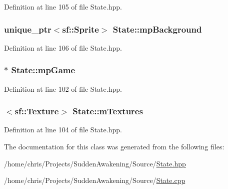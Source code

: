 Definition at line 105 of file State.\-hpp.

\hypertarget{class_state_ad77d6e8727cab4ac8ac5d44eacb41eba}{
\subsubsection[{mp\-Background}]{\setlength{\rightskip}{0pt plus 5cm}unique\-\_\-ptr$<$sf\-::\-Sprite$>$ State\-::mp\-Background\hspace{0.3cm}{\ttfamily [protected]}}}\label{class_state_ad77d6e8727cab4ac8ac5d44eacb41eba}


Definition at line 106 of file State.\-hpp.

\hypertarget{class_state_a418f507cf3deef8f3653b8209a9f7b85}{
\subsubsection[{mp\-Game}]{$\ast$ State\-::mp\-Game\hspace{0.3cm}{\ttfamily [protected]}}}\label{class_state_a418f507cf3deef8f3653b8209a9f7b85}


Definition at line 102 of file State.\-hpp.

\hypertarget{class_state_a4eb530bbd8c56bb10ab4e36adeb097d9}{
\subsubsection[{m\-Textures}]{$<$sf\-::\-Texture$>$ State\-::m\-Textures\hspace{0.3cm}{\ttfamily [protected]}}}\label{class_state_a4eb530bbd8c56bb10ab4e36adeb097d9}


Definition at line 104 of file State.\-hpp.



The documentation for this class was generated from the following files\-:\begin{DoxyCompactItemize}
\item 
/home/chris/\-Projects/\-Sudden\-Awakening/\-Source/\hyperlink{_state_8hpp}{State.\-hpp}\item 
/home/chris/\-Projects/\-Sudden\-Awakening/\-Source/\hyperlink{_state_8cpp}{State.\-cpp}\end{DoxyCompactItemize}
